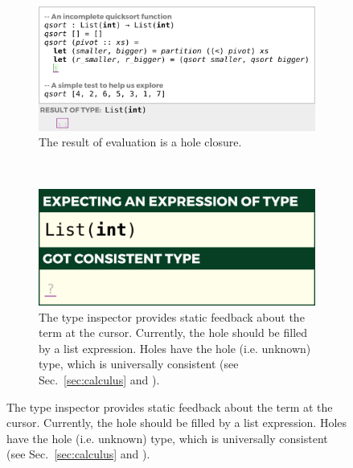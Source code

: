 
\begin{figure}[t]
\begin{subfigure}[t]{0.70\textwidth}
\centering
\includegraphics[width=\textwidth,interpolate=false,valign=t]{images/qsort-code.png}
\vspace{-3px}
\caption{The result of evaluation is a hole closure.}
\label{fig:qsort-example-code}
\end{subfigure}
~
\begin{subfigure}[t]{0.29\textwidth}
\centering
\includegraphics[width=\textwidth,interpolate=false,valign=t]{images/type-inspector.png}
\vspace{-3px}
\caption{The type inspector provides static feedback about the term at the cursor. Currently, the hole should be filled by a list expression. Holes have the hole (i.e. unknown) type, which  is universally consistent (see Sec.~\ref{sec:calculus} and \cite{popl-paper}).
}
\label{fig:qsort-type-inspector}
\end{subfigure}

\vspace{8px}


\end{figure}
